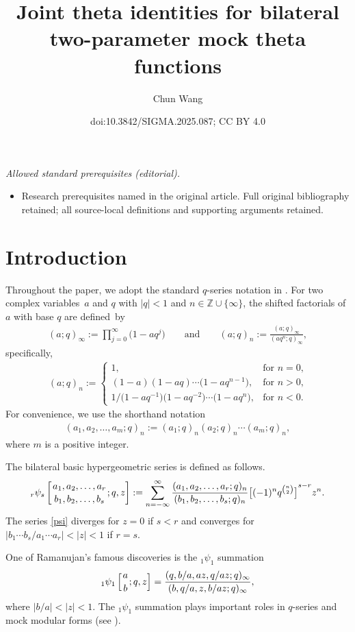 \documentclass[10pt,a4paper]{amsart}
\title{Joint theta identities for bilateral two-parameter mock theta functions}
\author{Chun Wang}
\date{doi:10.3842/SIGMA.2025.087; CC BY 4.0}
\numberwithin{equation}{section}
\begin{document}
\maketitle
\noindent\textit{Allowed standard prerequisites (editorial).}\begin{itemize}
\item Research prerequisites named in the original article. Full original bibliography retained; all source-local definitions and supporting arguments retained.
\end{itemize}\medskip
\section{Introduction}
Throughout the paper, we adopt the standard $q$-series notation in \cite{GR}.
For two complex variables~$a$ and $q$ with $|q|<1$ and $n\in \mathbb{Z}\cup \{\infty\}$, the shifted factorials of $a$ with base $q$ are defined~by
\begin{align*}
(a;q)_{\infty}:=\prod_{j=0}^{\infty}\bigl(1-aq^{j}\bigr) \qquad \text{and} \qquad
(a;q)_{n}:=\frac{(a;q)_{\infty}}{(aq^n;q)_{\infty}},
\end{align*}
specifically,
\begin{align*}
(a;q)_n:=
      \begin{cases}
       1, & \text{for $n=0$,} \\
       (1-a)(1-aq)\cdots\bigl(1-aq^{n-1}\bigr), & \text{for $n>0$,} \\
      1/\bigl(1-aq^{-1}\bigr)\bigl(1-aq^{-2}\bigr)\cdots\bigl(1-aq^n\bigr), & \text{for $n<0$.}
      \end{cases}
\end{align*}
For convenience, we use the shorthand notation
\begin{align*}
(a_1,a_2,\ldots,a_m;q)_n:=(a_1;q)_n(a_2;q)_n\cdots(a_m;q)_n,
\end{align*}
where $m$ is a positive integer.

The bilateral basic hypergeometric series is defined as follows.
\begin{align}\label{psi}
_r\psi_s\left[{a_1,a_2,\dots,a_r\atop b_1,b_2,\dots,b_s};q,z\right]
:=\sum_{n=-\infty}^\infty\frac{(a_1,a_2,\dots,a_r;q )_n}
{(b_1,b_2,\dots,b_s;q)_n}{\big[(-1)^{n}q^{n\choose2}\big]}^{s-r}z^n.
\end{align}
The series \eqref{psi} diverges for $z=0$ if $s < r$ and converges for $|b_1\cdots b_s/a_1\cdots a_r|<
|z| < 1$ if $r = s$.


One of Ramanujan's famous discoveries is the $_1\psi_1$ summation \cite[equation (5.2.1)]{GR}
\begin{align}\label{0-5}
{_1\psi_1}\left[{a \atop b};q,z\right]
=\frac{(q,b/a,az,q/az;q)_{\infty}}{(b,q/a,z,b/az;q)_{\infty}},
\end{align}
where $|b/a| < |z| < 1$.  The $_1\psi_1$ summation plays
important roles in $q$-series and mock modular forms (see \cite{AB,B,K}).
\end{document}
